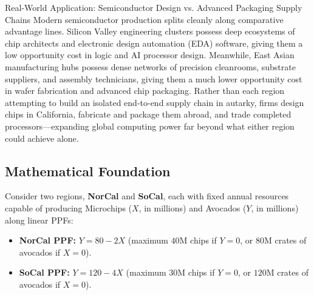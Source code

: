 \documentclass[11pt,letterpaper]{article}
\begin{document}
\begin{examplecase}{Real-World Application: Semiconductor Design vs. Advanced Packaging Supply Chains}
Modern semiconductor production splits cleanly along comparative advantage lines. Silicon Valley engineering clusters possess deep ecosystems of chip architects and electronic design automation (EDA) software, giving them a low opportunity cost in logic and AI processor design. Meanwhile, East Asian manufacturing hubs possess dense networks of precision cleanrooms, substrate suppliers, and assembly technicians, giving them a much lower opportunity cost in wafer fabrication and advanced chip packaging. Rather than each region attempting to build an isolated end-to-end supply chain in autarky, firms design chips in California, fabricate and package them abroad, and trade completed processors—expanding global computing power far beyond what either region could achieve alone.
\end{examplecase}

\subsection*{Mathematical Foundation}
Consider two regions, \textbf{NorCal} and \textbf{SoCal}, each with fixed annual resources capable of producing Microchips ($X$, in millions) and Avocados ($Y$, in millions) along linear PPFs:
\begin{itemize}
    \item \textbf{NorCal PPF:} $Y = 80 - 2X$ (maximum $40\text{M}$ chips if $Y = 0$, or $80\text{M}$ crates of avocados if $X = 0$).
    \item \textbf{SoCal PPF:} $Y = 120 - 4X$ (maximum $30\text{M}$ chips if $Y = 0$, or $120\text{M}$ crates of avocados if $X = 0$).
\end{itemize}
\end{document}
